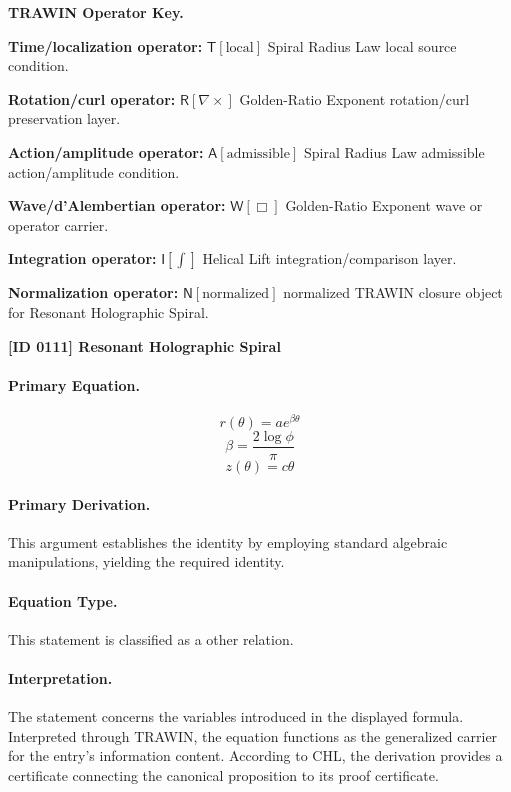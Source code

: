 \par\vspace{0.45\baselineskip}
\noindent\begin{minipage}[t]{\linewidth}
\begingroup
\small
\raggedright
\textbf{TRAWIN Operator Key.}\par
\noindent\textbf{Time/localization operator:} $\mathsf{T}\!\left[\mathrm{local}\right]$ Spiral Radius Law local source condition.\par
\noindent\textbf{Rotation/curl operator:} $\mathsf{R}\!\left[\nabla\times\right]$ Golden-Ratio Exponent rotation/curl preservation layer.\par
\noindent\textbf{Action/amplitude operator:} $\mathsf{A}\!\left[\mathrm{admissible}\right]$ Spiral Radius Law admissible action/amplitude condition.\par
\noindent\textbf{Wave/d'Alembertian operator:} $\mathsf{W}\!\left[\Box\right]$ Golden-Ratio Exponent wave or operator carrier.\par
\noindent\textbf{Integration operator:} $\mathsf{I}\!\left[\int\right]$ Helical Lift integration/comparison layer.\par
\noindent\textbf{Normalization operator:} $\mathsf{N}\!\left[\mathrm{normalized}\right]$ normalized TRAWIN closure object for Resonant Holographic Spiral.\par
\endgroup
\end{minipage}

\clearpage
\noindent\textbf{[ID 0111] Resonant Holographic Spiral}\par
\vspace{0.35em}
\paragraph{Primary Equation.}
\[
r(\theta)=a e^{\beta \theta}
\]
\[
\beta = \frac{2\log \phi}{\pi}
\]
\[
z(\theta)=c\theta
\]

\paragraph{Primary Derivation.}
This argument establishes the identity by employing standard algebraic manipulations, yielding the required identity.
\paragraph{Equation Type.}
This statement is classified as a other relation.

\paragraph{Interpretation.}
The statement concerns the variables introduced in the displayed formula. Interpreted through TRAWIN, the equation functions as the generalized carrier for the entry’s information content. According to CHL, the derivation provides a certificate connecting the canonical proposition to its proof certificate.

